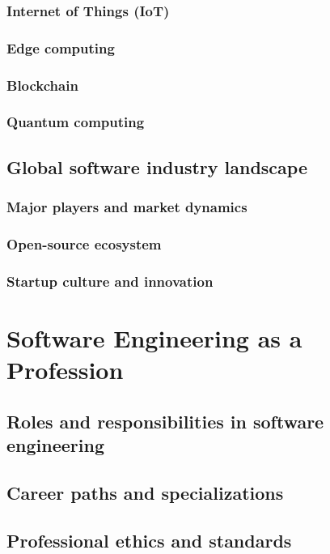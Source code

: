\begin{refsection}
\begin{multicols}{2}
{\subsubsection{Internet of Things (IoT)}
\subsubsection{Edge computing}
\subsubsection{Blockchain}
\subsubsection{Quantum computing}
\subsection{Global software industry landscape}
\subsubsection{Major players and market dynamics}
\subsubsection{Open-source ecosystem}
\subsubsection{Startup culture and innovation}

}
\newpage
\end{multicols}
\section{Software Engineering as a Profession}
\begin{multicols}{2}
{\small

\subsection{Roles and responsibilities in software engineering}
\subsection{Career paths and specializations}
\subsection{Professional ethics and standards}
}
\end{multicols}
\end{refsection}
